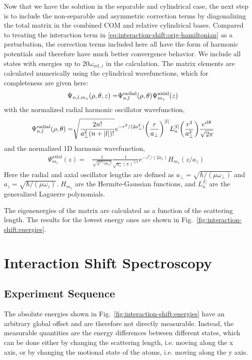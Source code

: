 Now that we have the solution in the separable and cylindrical case,
the next step is to include the non-separable and asymmetric correction terms
by diagonalizing the total matrix in the combined COM and relative cylindrical bases.
Compared to treating the interaction term in \ref{eq:interaction-shift:orig-hamiltonian}
as a perturbation, the correction terms included here all have the form of
harmonic potentials and therefore have much better convergence behavior.
We include all states with energies up to $20 \omega_{\mathrm{rel},z}$ in the calculation.
The matrix elements are calculated numerically using the cylindrical wavefunctions,
which for completeness are given here:
\begin{align*}
  \Psi_{n,l,m_z}{\left({\rho,\theta,z}\right)}=
  &\Psi^{\mathrm{radial}}_{n,l}{\left({\rho, \theta}\right)}\Psi^{\mathrm{axial}}_{m_z}{\left({z}\right)}
\end{align*}
with the normalized radial harmonic oscillator wavefunction,
\begin{align*}
  \Psi^{\mathrm{radial}}_{n,l}{\left({\rho, \theta}\right)}=
  &\sqrt{\frac{2n!}{a_\perp^2 (n+|l|)!}} e^{-r^2/(2 a_\perp^2)} {\left({\frac{r}{a_\perp}}\right)}^{|l|}
    L_n^{|l|}{\left({\frac{r^2}{a_\perp^2}}\right)} \frac{ e^{i l \theta}}{\sqrt{2 \pi}}
\end{align*}
and the normalized 1D harmonic wavefunction,
\begin{align*}
  \Psi^{\mathrm{axial}}_{m_z}(z)=&\frac{1}{\sqrt{2^{m_z} m_z!}} \frac{1}{\sqrt{a_z}(\pi)^{1/4}}
                                   e^{-z^2/(2 a_z)} H_{m_z}( z/a_z)
\end{align*}
Here the radial and axial oscillator lengths are defined as
$a_\perp = \sqrt{\hbar/( \mu \omega_\perp)}$ and $a_z = \sqrt{\hbar/ (\mu \omega_z)}$.
$H_{m_z}$ are the Hermite-Gaussian functions,
and $L^{|l|}_n$ are the generalized Laguerre polynomials.

The eigenenergies of the matrix are calculated as a function of the scattering length.
The results for the lowest energy ones are shown in Fig.~\ref{fig:interaction-shift:energies}.

\section{Interaction Shift Spectroscopy}

\subsection{Experiment Sequence}
The absolute energies shown in Fig.~\ref{fig:interaction-shift:energies} have an arbitrary global
offset and are therefore not directly measurable.
Instead, the measurable quantities are the energy differences between different states,
which can be done either by changing the scattering length, i.e. moving along the x axis,
or by changing the motional state of the atoms, i.e. moving along the y axis.

